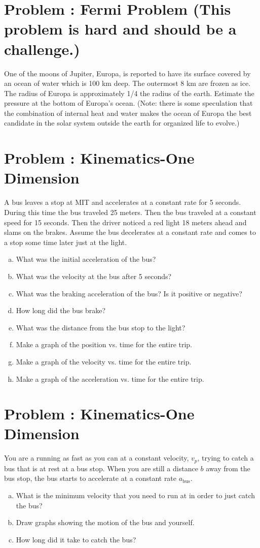 \documentclass[problems]{esg8012pset}
\date{September 8}
\begin{document}
\section{Problem \thesection: Fermi Problem (This problem is hard and should be a challenge.)}
  One of the moons of Jupiter, Europa, is reported to have its surface covered by an ocean of water
  which is 100 km deep.  The outermost 8 km are frozen as ice. The radius of Europa is
  approximately 1/4 the radius of the earth. Estimate the pressure at the bottom of Europa's ocean.
  (Note: there is some speculation that the combination of internal heat and water makes the ocean
  of Europa the best candidate in the solar system outside the earth for organized life to evolve.)
\section{Problem \thesection: Kinematics-One Dimension}
  A bus leaves a stop at MIT and accelerates at a constant rate for 5 seconds. During this time the
  bus traveled 25 meters. Then the bus traveled at a constant speed for 15 seconds. Then the driver
  noticed a red light 18 meters ahead and slams on the brakes. Assume the bus decelerates at a
  constant rate and comes to a stop some time later just at the light.
  \begin{enumerate}[a)]
    \item What was the initial acceleration of the bus?
    \item What was the velocity at the bus after 5 seconds?
    \item What was the braking acceleration of the bus? Is it positive or negative?
    \item How long did the bus brake?
    \item What was the distance from the bus stop to the light?
    \item Make a graph of the position vs. time for the entire trip.
    \item Make a graph of the velocity vs. time for the entire trip.
    \item Make a graph of the acceleration vs. time for the entire trip.
  \end{enumerate}
\section{Problem \thesection: Kinematics-One Dimension}
  You are a running as fast as you can at a constant velocity, $v_p$, trying to catch a bus that is at rest
  at a bus stop. When you are still a distance $b$ away from the bus stop, the bus starts to accelerate
  at a constant rate $a_\text{bus}$.
  \begin{enumerate}[a)]
    \item What is the minimum velocity that you need to run at in order to just catch the bus?
    \item Draw graphs showing the motion of the bus and yourself.
    \item How long did it take to catch the bus?
  \end{enumerate}
\end{document}
